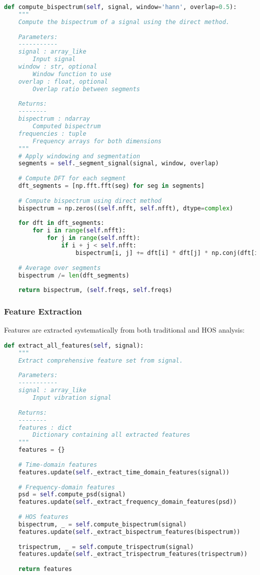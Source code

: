 \begin{lstlisting}[language=Python, caption=Bispectrum computation implementation]
def compute_bispectrum(self, signal, window='hann', overlap=0.5):
    """
    Compute the bispectrum of a signal using the direct method.
    
    Parameters:
    -----------
    signal : array_like
        Input signal
    window : str, optional
        Window function to use
    overlap : float, optional
        Overlap ratio between segments
        
    Returns:
    --------
    bispectrum : ndarray
        Computed bispectrum
    frequencies : tuple
        Frequency arrays for both dimensions
    """
    # Apply windowing and segmentation
    segments = self._segment_signal(signal, window, overlap)
    
    # Compute DFT for each segment
    dft_segments = [np.fft.fft(seg) for seg in segments]
    
    # Compute bispectrum using direct method
    bispectrum = np.zeros((self.nfft, self.nfft), dtype=complex)
    
    for dft in dft_segments:
        for i in range(self.nfft):
            for j in range(self.nfft):
                if i + j < self.nfft:
                    bispectrum[i, j] += dft[i] * dft[j] * np.conj(dft[i + j])
    
    # Average over segments
    bispectrum /= len(dft_segments)
    
    return bispectrum, (self.freqs, self.freqs)
\end{lstlisting}

\subsubsection{Feature Extraction}

Features are extracted systematically from both traditional and HOS analysis:

\begin{lstlisting}[language=Python, caption=Feature extraction implementation]
def extract_all_features(self, signal):
    """
    Extract comprehensive feature set from signal.
    
    Parameters:
    -----------
    signal : array_like
        Input vibration signal
        
    Returns:
    --------
    features : dict
        Dictionary containing all extracted features
    """
    features = {}
    
    # Time-domain features
    features.update(self._extract_time_domain_features(signal))
    
    # Frequency-domain features
    psd = self.compute_psd(signal)
    features.update(self._extract_frequency_domain_features(psd))
    
    # HOS features
    bispectrum, _ = self.compute_bispectrum(signal)
    features.update(self._extract_bispectrum_features(bispectrum))
    
    trispectrum, _ = self.compute_trispectrum(signal)
    features.update(self._extract_trispectrum_features(trispectrum))
    
    return features
\end{lstlisting}

